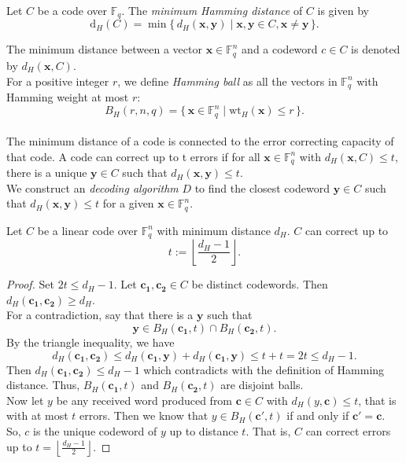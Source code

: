 \begin{definition}
Let $C$ be a code over $\mathbb F_q$. The \textit{minimum Hamming distance} of $C$ is given by
\[
\mathrm{d}_H(C) = 
\min\{\,d_H(\textbf{x}, \textbf{y}) \mid 
\textbf{x}, \textbf{y} \in C, \textbf{x} \neq \textbf{y} \,\}.
\]
\end{definition}

The minimum distance between a vector $\mathbf{x} \in \mathbb{F}_q^n$ and a codeword $c \in C$ is denoted by $d_H(\mathbf{x}, C)$.\\[0.4cm]
For a positive integer $r$, we define \emph{Hamming ball} as all the vectors in $\mathbb{F}_q^n$ with Hamming weight at most $r$:
\[
B_H(r, n, q) =
\{\, \mathbf{x} \in \mathbb{F}_q^n \mid 
\mathrm{wt}_H(\textbf{x}) \leq \textit{r}\,\}.
\]
\\[0.4cm]
The minimum distance of a code is connected to the error correcting capacity of that code. A code can correct up to t errors if for all 
$\mathbf{x} \in \mathbb{F}_q^n$ with $d_H(\mathbf{x}, C) \leq t$, there is a unique $\mathbf{y} \in C$ such that $d_H(\mathbf{x}, \mathbf{y}) \leq t$.\\[0.4cm]
We construct an \textit{decoding algorithm} $D$ to find the closest codeword $\mathbf{y} \in C$ such that $d_H(\mathbf{x}, \mathbf{y}) \leq t$ for a given 
$\mathbf{x} \in \mathbb{F}_q^n$.\\[0.4cm]
\begin{proposition}
Let $C$ be a linear code over $\mathbb{F}_q^n$ with minimum distance $d_H$. $C$ can correct up to 
\[
t := \left\lfloor\frac{d_H - 1}{2}\right\rfloor.
\]
\end{proposition}

\begin{proof}
Set $2t\leq d_H-1$. Let $\mathbf{c_1}, \mathbf{c_2}\in C$ be distinct codewords. Then $d_H(\mathbf{c_1},\mathbf{c_2})\geq d_H$.\\
For a contradiction, say that there is a $\mathbf{y}$ such that
\[
\mathbf{y}\in B_H(\mathbf{c_1}, t) \cap B_H(\mathbf{c_2}, t).
\]
By the triangle inequality, we have
\[
d_H(\mathbf{c_1}, \mathbf{c_2})\leq d_H(\mathbf{c_1},\mathbf{y}) +d_H(\mathbf{c_1},\mathbf{y})\leq t+t=2t\leq d_H-1. 
\]
Then $d_H(\mathbf{c_1}, \mathbf{c_2})\leq d_H-1$ which contradicts with the definition of Hamming distance. Thus, $B_H(\mathbf{c_1}, t)$ and $B_H(\mathbf{c_2}, t)$ are disjoint balls.\\[0.2cm]
Now let $y$ be any received word produced from $\mathbf{c}\in C$ with $d_H(y, \mathbf{c})\leq t$, that is with at most $t$ errors. Then we know that $y\in B_H(\mathbf{c'}, t)$ if and only if $\mathbf{c'}=\mathbf{c}$. So, $c$ is the unique codeword of $y$ up to distance $t$. That is, $C$ can correct errors up to $t = \left\lfloor\frac{d_H - 1}{2}\right\rfloor$. 
\end{proof}

